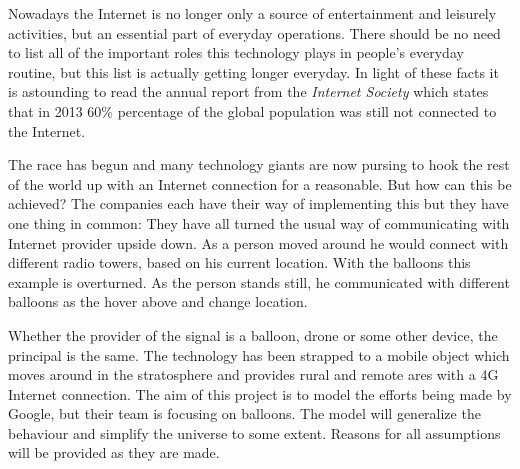 Nowadays the Internet is no longer only a source of entertainment and leisurely activities, but an essential part of everyday operations. There should be no need to list all of the important roles this technology plays in people's everyday routine, but this list is actually getting longer everyday. In light of these facts it is astounding to read the annual report from the \textit{Internet Society} which states that in 2013 60\% percentage of the global population was still not connected to the Internet. 

The race has begun and many technology giants are now pursing to hook the rest of the world up with an Internet connection for a reasonable. But how can this be achieved? The companies each have their way of implementing this but they have one thing in common: They have all turned the usual way of communicating with Internet provider upside down. As a person moved around he would connect with different radio towers, based on his current location. With the balloons this example is overturned. As the person stands still, he communicated with different balloons as the hover above and change location.

Whether the provider of the signal is a balloon, drone or some other device, the principal is the same. The technology has been strapped to a mobile object which moves around in the stratosphere and provides rural and remote ares with a 4G Internet connection. The aim of this project is to model the efforts being made by Google, but their team is focusing on balloons. The model will generalize the behaviour and simplify the universe to some extent. Reasons for all assumptions will be provided as they are made.